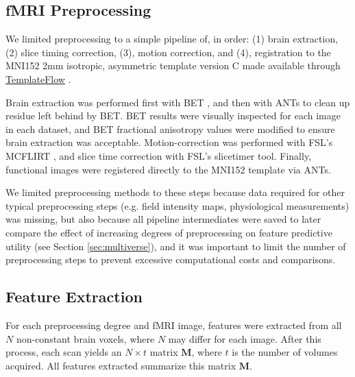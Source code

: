 \documentclass[12pt]{spieman}  %
\begin{document}
\begin{spacing}{2}
\subsection{fMRI Preprocessing}
\label{sec:preproc}

We limited preprocessing to a simple pipeline of, in order: (1) brain
extraction, (2) slice timing correction, (3), motion correction, and (4),
registration to the MNI152
\cite{fonovUnbiasedAverageAgeappropriate2011, fonovUnbiasedNonlinearAverage2009}
2mm isotropic, asymmetric template version C made available through
\href{https://www.templateflow.org/}{TemplateFlow}
\cite{ciricTemplateFlowFAIRsharingMultiscale2021}.

Brain extraction was performed first with BET
\cite{smithFastRobustAutomated2002}, and then with
ANTs\cite{avantsReproducibleEvaluationANTs2011} to clean up residue left behind
by BET. BET results were visually inspected for each image in each dataset, and
BET fractional anisotropy values were modified to ensure brain extraction was
acceptable. Motion-correction was performed with FSL's MCFLIRT
\cite{jenkinsonImprovedOptimizationRobust2002}, and slice time correction
with FSL's slicetimer\cite{jenkinsonFSL2012} tool. Finally, functional
images were registered directly to the MNI152 template via
ANTs\cite{avantsReproducibleEvaluationANTs2011}.

We limited preprocessing methods to these steps because data required for other
typical preprocessing steps (e.g. field intensity maps, physiological
measurements) was missing, but also because all pipeline intermediates were
saved to later compare the effect of increasing degrees of preprocessing on
feature predictive utility (see Section \ref{sec:multiverse}), and it was
important to limit the number of preprocessing steps to prevent excessive
computational costs and comparisons.



\subsection{Feature Extraction}

For each preprocessing degree and fMRI image, features were extracted from all
\(N\) non-constant brain voxels, where \(N\) may differ for each image. After
this process, each scan yields an \(N \times t\) matrix \(\mathbf{M}\), where
\(t\) is the number of volumes acquired. All features extracted summarize
this matrix \(\mathbf{M}\).


\end{spacing}
\end{document}
